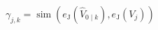\documentclass[border=4pt]{standalone}
\begin{document}
$\displaystyle
\gamma_{j,k}=\operatorname{sim}(e_{\mathrm J}(\widehat V_{0\mid k}),e_{\mathrm J}(V_j))
$
\end{document}

